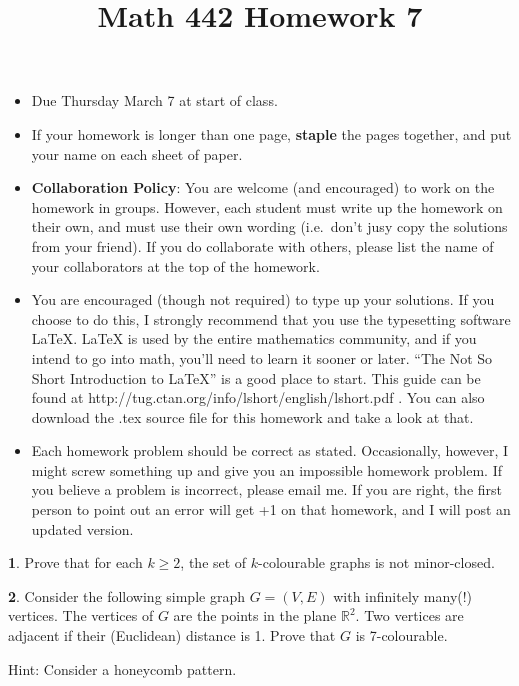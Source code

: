 \documentclass[12pt]{article}
\title{\vspace{-2.0cm}Math 442 Homework 7}
\date{}
\theoremstyle{definition}
\newtheorem{problem}{}
\begin{document}
%
%
\maketitle
%
\vspace{-16 mm}
\begin{itemize}
\item Due Thursday March 7 at start of class.
%
\item If your homework is longer than one page, {\bf staple} the pages together, and put your name on each sheet of paper.
%
\item {\bf Collaboration Policy}: You are welcome (and encouraged) to work on the homework in groups. However, each student must write up the homework on their own, and must use their own wording (i.e.~don't jusy copy the solutions from your friend). If you do collaborate with others, please list the name of your collaborators at the top of the homework.

\item You are encouraged (though not required) to type up your solutions. If you choose to do this, I strongly recommend that you use the typesetting software LaTeX. LaTeX is used by the entire mathematics community, and if you intend to go into math, you’ll need to learn it sooner or later. ``The Not So Short Introduction to LaTeX'' is a good place to start. This guide can be found at http://tug.ctan.org/info/lshort/english/lshort.pdf . You can also download the .tex source file for this homework and take a look at that.

\item Each homework problem should be correct as stated. Occasionally, however, I might screw something up and give you an impossible homework problem. If you believe a problem is incorrect, please email me. If you are right, the first person to point out an error will get +1 on that homework, and I will post an updated version. 
\end{itemize}

\begin{problem}
Prove that for each $k\geq 2$, the set of $k$-colourable graphs is not minor-closed. 
\end{problem}

\begin{problem}
Consider the following simple graph $G=(V,E)$ with infinitely many(!) vertices. The vertices of $G$ are the points in the plane $\mathbb{R}^2$. Two vertices are adjacent if their (Euclidean) distance is 1. Prove that $G$ is 7-colourable. 

Hint: Consider a honeycomb pattern.

\end{problem} 
\end{document}
